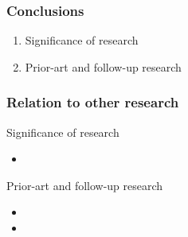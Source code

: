 
\begin{frame}
	\frametitle{Conclusions}


	\begin{enumerate}
		\item Significance of research
		\item Prior-art and follow-up research
	\end{enumerate}

\end{frame}


\begin{frame}
	\frametitle{Relation to other research}

	\begin{block}{Significance of research}

		\begin{itemize}
			\item {}
		\end{itemize}
	\end{block}

%

	\begin{block}{Prior-art and follow-up research}
		\begin{itemize}
			\item {}
			\item {}
		\end{itemize}
	\end{block}

\end{frame}


%
%

